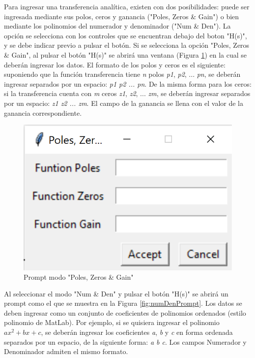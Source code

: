 Para ingresar una transferencia analítica, existen con dos posibilidades: puede ser ingresada mediante sus polos, ceros y ganancia ("Poles, Zeros \& Gain") o bien mediante los polinomios del numerador y denominador ("Num \& Den"). La opción se selecciona con los controles que se encuentran debajo del boton "H(s)", y se debe indicar previo a pulsar el botón. 
Si se selecciona la opción "Poles, Zeros \& Gain", al pulsar el botón "H(s)" se abrirá una ventana (Figura \ref{fig:pzgPromt}) en la cual se deberán ingresar los datos. El formato de los polos y ceros es el siguiente: suponiendo que la función transferencia tiene \emph{n} polos \emph{p1}, \emph{p2}, ... \emph{pn}, se deberán ingresar separados por un espacio: \emph{p1 p2 ... pn}. De la misma forma para los ceros: si la transferencia cuenta con \emph{m} ceros \emph{z1}, \emph{z2}, ... \emph{zm}, se deberán ingresar separados por un espacio: \emph{z1 z2 ... zm}. El campo de la ganancia se llena con el valor de la ganancia correspondiente.

\begin{figure}[ht]
\centering
\includegraphics[scale=0.3]{resources/pzgPrompt.png}
\caption{Prompt modo "Poles, Zeros \& Gain"}
\label{fig:pzgPromt}
\end{figure}

Al seleccionar el modo "Num \& Den" y pulsar el botón "H(s)" se abrirá un prompt como el que se muestra en la Figura \ref{fig:numDenPrompt}. Los datos se deben ingresar como un conjunto de coeficientes de polinomios ordenados (estilo polinomio de MatLab). Por ejemplo, si se quisiera ingresar el polinomio $ax^2 + bx + c$, se deberán ingresar los coeficientes \emph{a}, \emph{b} y \emph{c} en forma ordenada separados por un espacio, de la siguiente forma: \emph{a b c}. Los campos Numerador y Denominador admiten el mismo formato.

